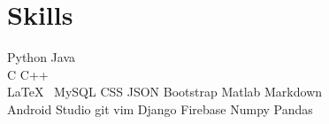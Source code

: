 
\section{Skills}
Python \textbullet{}   Java \\
C \textbullet{} C++ \\
\LaTeX\ \textbullet{} MySQL \textbullet{} CSS \textbullet{} JSON \textbullet{} Bootstrap \textbullet{} Matlab \textbullet{} Markdown \\

Android Studio  \textbullet{} git \textbullet{} vim \textbullet{} Django \textbullet{} Firebase \textbullet{} Numpy \textbullet{} Pandas
\sectionsep